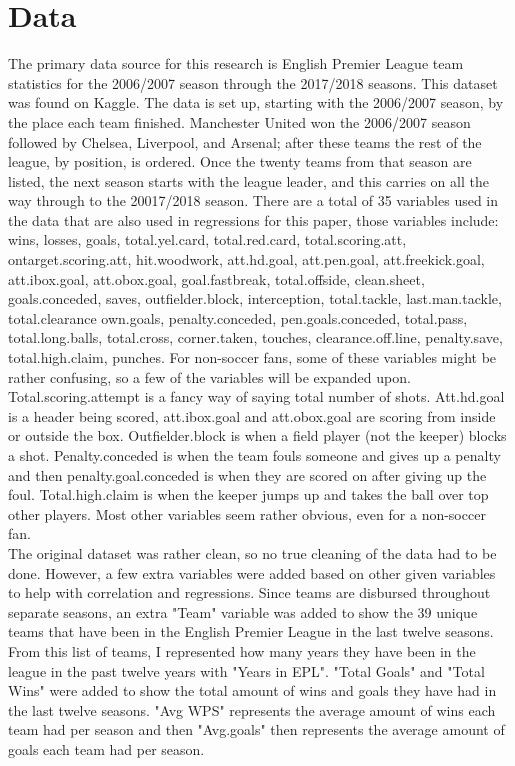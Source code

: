 \documentclass[12pt,english]{article}
\begin{document}
\section{Data}\label{sec:data}
\begin{Data}
\begin{doublespace}


The primary data source for this research is English Premier League team statistics for the 2006/2007 season through the 2017/2018 seasons. This dataset was found on Kaggle. The data is set up, starting with the 2006/2007 season, by the place each team finished. Manchester United won the 2006/2007 season followed by Chelsea, Liverpool, and Arsenal; after these teams the rest of the league, by position, is ordered. Once the twenty teams from that season are listed, the next season starts with the league leader, and this carries on all the way through to the 20017/2018 season. There are a total of 35 variables used in the data that are also used in regressions for this paper, those variables include: wins, losses, goals, total.yel.card, total.red.card,	total.scoring.att,	ontarget.scoring.att,	hit.woodwork, att.hd.goal,	att.pen.goal,	att.freekick.goal,	att.ibox.goal,	att.obox.goal,	goal.fastbreak,	total.offside,	clean.sheet,	goals.conceded,	saves,	outfielder.block,	interception,	total.tackle,	last.man.tackle,	total.clearance	own.goals,	penalty.conceded,	pen.goals.conceded,	total.pass,	total.long.balls,	total.cross,	corner.taken,	touches,	clearance.off.line,	penalty.save,	total.high.claim,	punches. For non-soccer fans, some of these variables might be rather confusing, so a few of the variables will be expanded upon. Total.scoring.attempt is a fancy way of saying total number of shots. Att.hd.goal is a header being scored, att.ibox.goal and att.obox.goal are scoring from inside or outside the box. Outfielder.block is when a field player (not the keeper) blocks a shot. Penalty.conceded is when the team fouls someone and gives up a penalty and then penalty.goal.conceded is when they are scored on after giving up the foul. Total.high.claim is when the keeper jumps up and takes the ball over top other players. Most other variables seem rather obvious, even for a non-soccer fan. \\
\indent The original dataset was rather clean, so no true cleaning of the data had to be done. However, a few extra variables were added based on other given variables to help with correlation and regressions. Since teams are disbursed throughout separate seasons, an extra "Team" variable was added to show the 39 unique teams that have been in the English Premier League in the last twelve seasons. From this list of teams, I represented how many years they have been in the league in the past twelve years with "Years in EPL". "Total Goals" and "Total Wins" were added to show the total amount of wins and goals they have had in the last twelve seasons. "Avg WPS" represents the average amount of wins each team had per season and then "Avg.goals" then represents the average amount of goals each team had per season.\\

\end{doublespace}
\end{Data}
\end{document}
